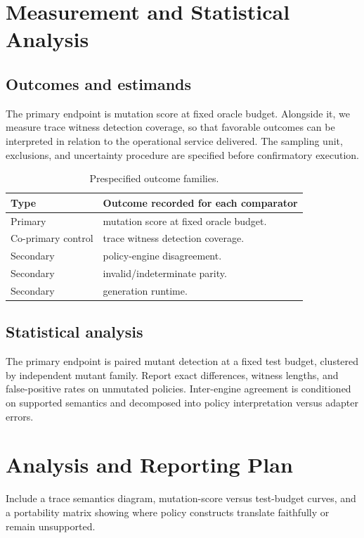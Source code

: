\documentclass[11pt,a4paper]{article}
\begin{document}
\section{Measurement and Statistical Analysis}
\subsection{Outcomes and estimands}
The primary endpoint is mutation score at fixed oracle budget. Alongside it, we measure trace witness detection coverage, so that favorable outcomes can be interpreted in relation to the operational service delivered. The sampling unit, exclusions, and uncertainty procedure are specified before confirmatory execution.
\begin{table}[ht]
\centering\footnotesize
\caption{Prespecified outcome families.}
\begin{tabularx}{\linewidth}{@{}lX@{}}\toprule
Type & Outcome recorded for each comparator \\ \midrule
Primary & mutation score at fixed oracle budget. \\ 
Co-primary control & trace witness detection coverage. \\ 
Secondary & policy-engine disagreement. \\ 
Secondary & invalid/indeterminate parity. \\ 
Secondary & generation runtime. \\ 
\bottomrule\end{tabularx}
\end{table}

\subsection{Statistical analysis}
The primary endpoint is paired mutant detection at a fixed test budget, clustered by independent mutant family. Report exact differences, witness lengths, and false-positive rates on unmutated policies. Inter-engine agreement is conditioned on supported semantics and decomposed into policy interpretation versus adapter errors.

\section{Analysis and Reporting Plan}
Include a trace semantics diagram, mutation-score versus test-budget curves, and a portability matrix showing where policy constructs translate faithfully or remain unsupported.
\end{document}
